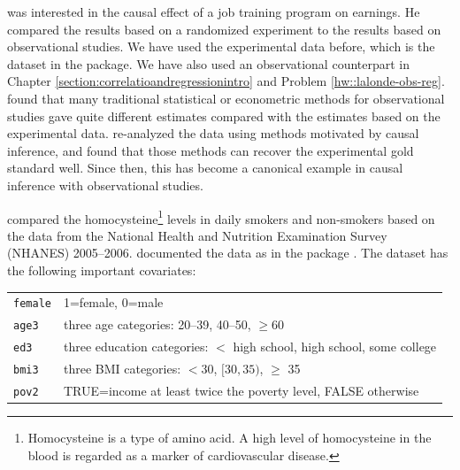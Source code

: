  \begin{example}
 \label{eg::job-training-obs}
 \citet{lalonde1986evaluating} was interested in the causal effect of a job training program on earnings. He compared the results based on a randomized experiment to the results based on observational studies. We have used the experimental data before, which is the  dataset in the  package. We have also used an observational counterpart  in Chapter \ref{section:correlatioandregressionintro} and Problem \ref{hw::lalonde-obs-reg}.  \citet{lalonde1986evaluating} found that many traditional statistical or econometric methods for observational studies gave quite different estimates compared with the estimates based on the experimental data. \cite{dehejia1999causal} re-analyzed the data using methods motivated by causal inference, and found that those methods can recover the experimental gold standard well. Since then, this has become a canonical example in causal inference with observational studies. 
 \end{example}
 
 
  \begin{example}
 \label{eg::nhanes2005-2006}
 \citet{bazzano2003relationship} compared the homocysteine\footnote{Homocysteine is a type of amino acid. A high level of homocysteine in the blood is regarded as a marker of cardiovascular disease.} levels in daily smokers and non-smokers based on the data from the National Health and Nutrition Examination Survey (NHANES) 2005--2006. \citet{rosenbaum2018sensitivity} documented the data as  in the   package . The dataset has the following important covariates:
 
\begin{tabular}{ll}
\hline 
\texttt{female} &
1=female, 0=male
\\
\texttt{age3} &
three age categories: 20--39, 40--50, $\geq $60
\\
\texttt{ed3} &
three education categories: $<$ high school, high school, some college
\\
\texttt{bmi3}&
three BMI categories: $<$30, $[30,35)$, $\geq $ 35
\\
\texttt{pov2}&
TRUE=income at least twice the poverty level, FALSE otherwise\\
\hline 
\end{tabular} 

 \end{example}
 
